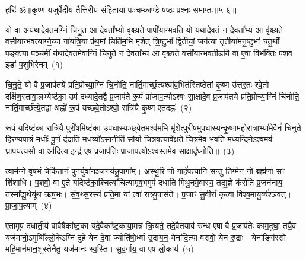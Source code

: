 {\anuvakamend[{पि॒शङ्गा॑ विꣳश॒तिः}]}%

{हरिः॑ ॐ}{॥कृष्ण-यजुर्वेदीय-तैत्तिरीय-संहितायां पञ्चम्काण्डे षष्ठः प्रश्नः समाप्तः॥५-६॥}

\setcounter{anuvakam}{0}
यो वा अय॑थादेवतम॒ग्निं चि॑नु॒त आ दे॒वता᳚भ्यो वृश्च्यते॒ पापी॑यान्भवति॒ यो य॑थादेव॒तं न दे॒वता᳚भ्य॒ आ वृ॑श्च्यते॒ वसी॑यान्भवत्याग्ने॒य्या गा॑यत्रि॒या प्र॑थ॒मां चिति॑म॒भि मृ॑शेत् त्रि॒ष्टुभा᳚ द्वि॒तीयां॒ जग॑त्या तृ॒तीया॑मनु॒ष्टुभा॑ चतु॒र्थीं प॒ङ्क्त्या प॑ञ्च॒मीं य॑थादेव॒तमे॒वाग्निं चि॑नुते॒ न दे॒वता᳚भ्य॒ आ वृ॑श्च्यते॒ वसी॑यान्भव॒तीडा॑यै॒ वा ए॒षा विभ॑क्तिः प॒शव॒ इडा॑ प॒शुभि॑रेनम्~(१)

चि॒नु॒ते॒ यो वै प्र॒जा\-प॑तये प्रति॒प्रोच्या॒ग्निं चि॒नोति॒ नार्ति॒मार्च्छ॒त्यश्वा॑व॒भित॑स्तिष्ठेतां कृ॒ष्ण उ॑त्तर॒तः श्वे॒तो दक्षि॑ण॒\-स्तावा॒लभ्येष्ट॑का॒ उप॑ दध्यादे॒तद्वै प्र॒जा\-प॑ते रू॒पं प्रा॑जाप॒त्यो\-ऽश्वः॑ सा॒क्षादे॒व प्र॒जा\-प॑तये प्रति॒प्रोच्या॒ग्निं चि॑नोति॒ नार्ति॒मार्च्छ॑त्ये॒तद्वा अह्नो॑ रू॒पं यच्छ्वे॒तो\-ऽश्वो॒ रात्रि॑यै कृ॒ष्ण ए॒तदह्नः॑~(२)

रू॒पं यदिष्ट॑का॒ रात्रि॑यै॒ पुरी॑ष॒मिष्ट॑का उपधा॒स्यञ्छ्वे॒तमश्व॑म॒भि मृ॑शे॒त्पुरी॑षमुपधा॒स्यन्कृ॒ष्णम॑होरा॒त्राभ्या॑मे॒वैनं॑ चिनुते हिरण्यपा॒त्रं मधोः᳚ पू॒र्णं द॑दाति मध॒व्यो॑\-ऽसा॒नीति॑ सौ॒र्या चि॒त्रव॒त्यावे᳚क्षते चि॒त्रमे॒व भ॑वति म॒ध्यन्दि॒ने\-ऽश्व॒मव॑ घ्रापयत्य॒सौ वा आ॑दि॒त्य इन्द्र॑ ए॒ष प्र॒जा\-प॑तिः प्राजाप॒त्यो\-ऽश्व॒स्तमे॒व सा॒क्षादृ॑ध्नोति॥~(३)

{}%

त्वाम॑ग्ने वृष॒भं चेकि॑तानं॒ पुन॒र्युवा॑नञ्ज॒नय॑न्नु॒पागा᳚म्। अ॒स्थू॒रि णो॒ गार्\mbox{}ह॑पत्यानि सन्तु ति॒ग्मेन॑ नो॒ ब्रह्म॑णा॒ सꣳ शि॑शाधि। प॒शवो॒ वा ए॒ते यदिष्ट॑का॒श्चित्यां᳚चित्यामृष॒भमुप॑ दधाति मिथु॒नमे॒वास्य॒ तद्य॒ज्ञे क॑रोति प्र॒जन॑नाय॒ तस्मा᳚द्यू॒थेयू॑थ ऋष॒भः। सं॒व॒थ्स॒रस्य॑ प्रति॒मां यां त्वा॑ रात्र्यु॒पास॑ते। प्र॒जाꣳ सु॒वीरां᳚ कृ॒त्वा विश्व॒मायु॒र्व्य॑श्ञवत्। प्रा॒जा॒प॒त्याम्~(४)

ए॒तामुप॑ दधाती॒यं वावैषैका᳚ष्ट॒का यदे॒वैका᳚ष्ट॒काया॒मन्नं॑ क्रि॒यते॒ तदे॒वैतयाव॑ रुन्ध ए॒षा वै प्र॒जा\-प॑तेः काम॒दुघा॒ तयै॒व यज॑मानो॒\-ऽमुष्मिँ॑ल्लो॒के᳚\-ऽग्निं दु॑हे॒ येन॑ दे॒वा ज्योति॑षो॒र्ध्वा उ॒दाय॒न्॒ येना॑दि॒त्या वस॑वो॒ येन॑ रु॒द्राः। येनाङ्गि॑रसो महि॒मान॑मान॒शुस्तेनै॑तु॒ यज॑मानः स्व॒स्ति। सु॒व॒र्गाय॒ वा ए॒ष लो॒काय॑~(५)

